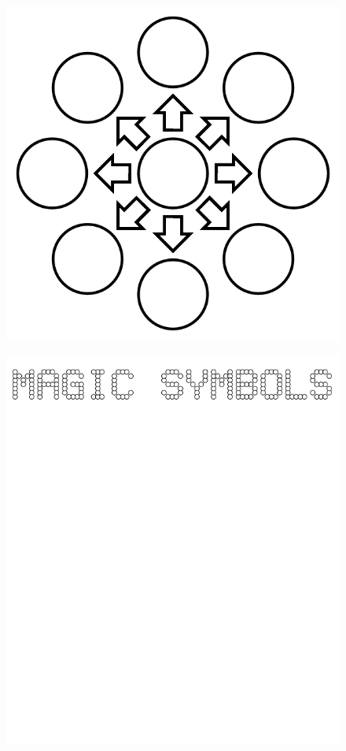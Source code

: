 \documentclass[17pt]{extreport}
\begin{document}
	\begin{figure}
		\centering
		\includegraphics[width=6.25in]{imageserver/uploadimages/image12.png}
	\end{figure}
	\begin{figure}
		\centering
		\includegraphics[width=6.25in]{imageserver/uploadimages/magicsymbols.png}
	\end{figure}	
\end{document}
